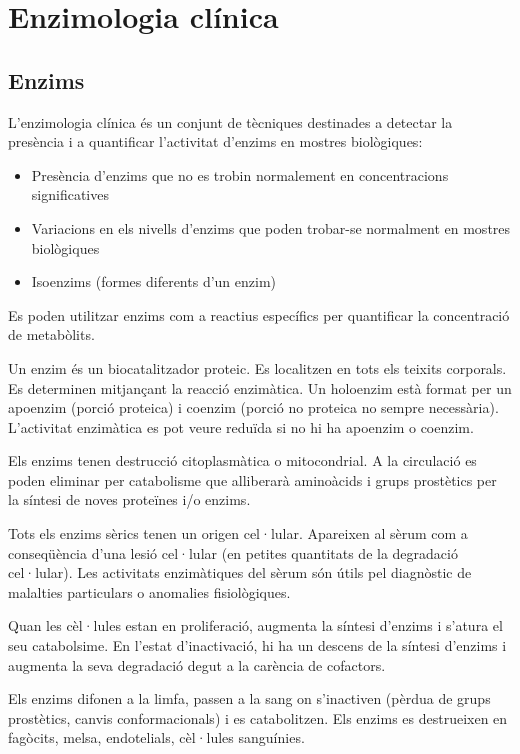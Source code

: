 \section{Enzimologia clínica}

\subsection{Enzims}
L'enzimologia clínica és un conjunt de tècniques destinades a detectar
la presència i a quantificar l'activitat d'enzims en mostres biològiques:
\begin{itemize}
\item Presència d'enzims que no es trobin normalement en
  concentracions significatives
\item Variacions en els nivells d'enzims que poden trobar-se
  normalment en mostres biològiques
\item Isoenzims (formes diferents d'un enzim)
\end{itemize}

Es poden utilitzar enzims com a reactius específics per quantificar la
concentració de metabòlits.

Un enzim és un biocatalitzador proteic. Es localitzen en tots els
teixits corporals. Es determinen mitjançant la reacció enzimàtica. Un
holoenzim està format per un apoenzim (porció proteica) i coenzim
(porció no proteica no sempre necessària). L'activitat enzimàtica es
pot veure reduïda si no hi ha apoenzim o coenzim.

Els enzims tenen destrucció citoplasmàtica o mitocondrial. A la
circulació es poden eliminar per catabolisme que alliberarà aminoàcids
i grups prostètics per la síntesi de noves proteïnes i/o enzims.

Tots els enzims sèrics tenen un origen cel·lular. Apareixen al sèrum
com a conseqüència d'una lesió cel·lular (en petites quantitats de la
degradació cel·lular). Les activitats enzimàtiques del sèrum són útils
pel diagnòstic de malalties particulars o anomalies fisiològiques.

Quan les cèl·lules estan en proliferació, augmenta la síntesi d'enzims
i s'atura el seu catabolsime. En l'estat d'inactivació, hi ha un
descens de la síntesi d'enzims i augmenta la seva degradació degut a
la carència de cofactors. 

Els enzims difonen a la limfa, passen a la sang on s'inactiven (pèrdua
de grups prostètics, canvis conformacionals) i es catabolitzen. Els
enzims es destrueixen en fagòcits, melsa, endotelials, cèl·lules sanguínies.

